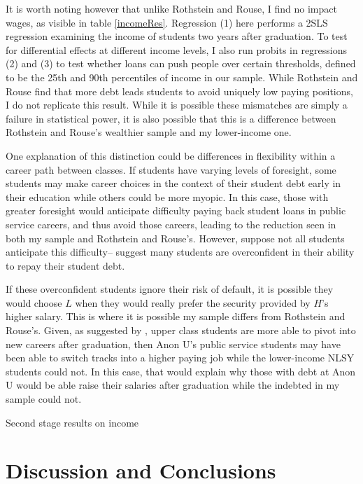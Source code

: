 \documentclass[12pt]{article}
\newcommand{\regs}{../Analysis/Regressions/Output/}
\begin{document}
	It is worth noting however that unlike Rothstein and Rouse, I find no impact wages, as visible in table \ref{incomeRes}. Regression (1) here performs a 2SLS regression examining the income of students two years after graduation. To test for differential effects at different income levels, I also run probits in regressions (2) and (3) to test whether loans can push people over certain thresholds, defined to be the 25th and 90th percentiles of income in our sample. While Rothstein and Rouse find that more debt leads students to avoid uniquely low paying positions, I do not replicate this result. While it is possible these mismatches are simply a failure in statistical power, it is also possible that this is a difference between Rothstein and Rouse's wealthier sample and my lower-income one. 
	
	One explanation of this distinction could be differences in flexibility within a career path between classes. If students have varying levels of foresight, some students may make career choices in the context of their student debt early in their education while others could be more myopic. In this case, those with greater foresight would anticipate difficulty paying back student loans in public service careers, and thus avoid those careers, leading to the reduction seen in both my sample and Rothstein and Rouse's. However, suppose not all students anticipate this difficulty--\textcite{smith2013} suggest many students are overconfident in their ability to repay their student debt. 
	
	If these overconfident students ignore their risk of default, it is possible they would choose $L$ when they would really prefer the security provided by $H$'s higher salary. This is where it is possible my sample differs from Rothstein and Rouse's. Given, as suggested by \textcite{mcleod2009}, upper class students are more able to pivot into new careers after graduation, then Anon U's public service students may have been able to switch tracks into a higher paying job while the lower-income NLSY students could not. In this case, that would explain why those with debt at Anon U would be able raise their salaries after graduation while the indebted in my sample could not.
	
	\begin{table}
		\centering
		\caption{Second stage results on income}
		\resizebox{\textwidth}{!}{		
			
		}
		\label{incomeRes}
	\end{table}
	
	\section{Discussion and Conclusions}
	
\end{document}
